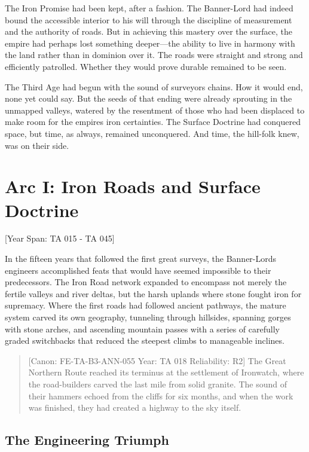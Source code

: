 The Iron Promise had been kept, after a fashion. The Banner-Lord had
indeed bound the accessible interior to his will through the discipline
of measurement and the authority of roads. But in achieving this mastery
over the surface, the empire had perhaps lost something deeper---the
ability to live in harmony with the land rather than in dominion over
it. The roads were straight and strong and efficiently patrolled.
Whether they would prove durable remained to be seen.

The Third Age had begun with the sound of surveyor\textquotesingle s
chains. How it would end, none yet could say. But the seeds of that
ending were already sprouting in the unmapped valleys, watered by the
resentment of those who had been displaced to make room for the
empire\textquotesingle s iron certainties. The Surface Doctrine had
conquered space, but time, as always, remained unconquered. And time,
the hill-folk knew, was on their side.

\section{Arc I: Iron Roads and Surface
Doctrine}\label{arc-i-iron-roads-and-surface-doctrine}

{[}Year Span: TA 015 - TA 045{]}

In the fifteen years that followed the first great surveys, the
Banner-Lord\textquotesingle s engineers accomplished feats that would
have seemed impossible to their predecessors. The Iron Road network
expanded to encompass not merely the fertile valleys and river deltas,
but the harsh uplands where stone fought iron for supremacy. Where the
first roads had followed ancient pathways, the mature system carved its
own geography, tunneling through hillsides, spanning gorges with stone
arches, and ascending mountain passes with a series of carefully graded
switchbacks that reduced the steepest climbs to manageable inclines.

\begin{quote}
{[}Canon: FE-TA-B3-ANN-055 \textbar{} Year: TA 018 \textbar{}
Reliability: R2{]} The Great Northern Route reached its terminus at the
settlement of Ironwatch, where the road-builders carved the last mile
from solid granite. The sound of their hammers echoed from the cliffs
for six months, and when the work was finished, they had created a
highway to the sky itself.
\end{quote}

\subsection{The Engineering Triumph}\label{the-engineering-triumph}

